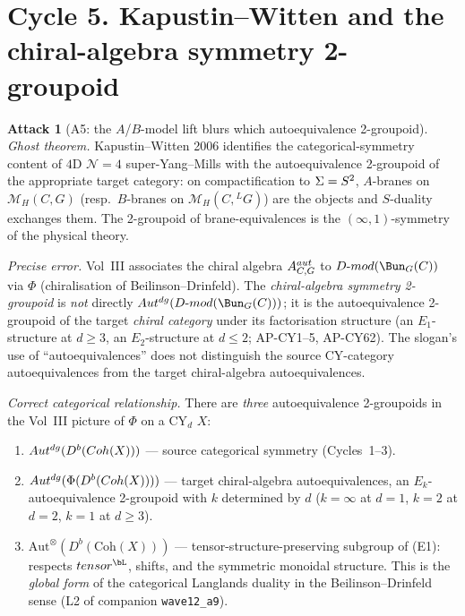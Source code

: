 \documentclass[11pt]{amsart}
\theoremstyle{definition}
\newtheorem{attack}{Attack}
\providecommand{\Coh}{\mathrm{Coh}}
\providecommand{\DMod}{D\text{-}\mathrm{mod}}
\providecommand{\Autdg}{\mathrm{Aut}^{\rm dg}}
\providecommand{\AutMon}{\mathrm{Aut}^{\otimes}}
\providecommand{\cM}{\mathcal{M}}
\providecommand{\Eone}{E_1}
\providecommand{\Etwo}{E_2}
\providecommand{\LG}{{}^L G}
\begin{document}
\section{Cycle 5. Kapustin--Witten and the chiral-algebra symmetry
2-groupoid}
\label{sec:cycle-KW}

\begin{attack}[A5: the $A$/$B$-model lift blurs which autoequivalence
2-groupoid]
\leavevmode

\noindent\emph{Ghost theorem.} Kapustin--Witten 2006 identifies the
categorical-symmetry content of $4$D $\mathcal{N} = 4$ super-Yang--Mills
with the autoequivalence 2-groupoid of the appropriate target
category: on compactification to $\Sigma = S^2$, $A$-branes on
$\cM_H(C, G)$ (resp.\ $B$-branes on $\cM_H(C, \LG)$) are the objects
and $S$-duality exchanges them. The 2-groupoid of brane-equivalences
is the $(\infty,1)$-symmetry of the physical theory.

\noindent\emph{Precise error.} Vol~III associates the chiral algebra
$\mathcal{A}^{\rm aut}_{C, G}$ to $\DMod(\Bun_G(C))$ via
$\Phi$ (chiralisation of Beilinson--Drinfeld). The
\emph{chiral-algebra symmetry 2-groupoid} is \emph{not} directly
$\Autdg(\DMod(\Bun_G(C)))$; it is the autoequivalence 2-groupoid of
the target \emph{chiral category} under its factorisation structure
(an $\Eone$-structure at $d \geq 3$, an $\Etwo$-structure at
$d \leq 2$; AP-CY1--5, AP-CY62). The slogan's use of
``autoequivalences'' does not distinguish the source CY-category
autoequivalences from the target chiral-algebra autoequivalences.

\noindent\emph{Correct categorical relationship.} There are
\emph{three} autoequivalence 2-groupoids in the Vol~III picture of
$\Phi$ on a CY$_d$ $X$:
\begin{enumerate}[label=(E\arabic*)]
 \item $\Autdg(D^b(\Coh(X)))$ --- source categorical symmetry
   (Cycles~1--3).
 \item $\Autdg(\Phi(D^b(\Coh(X))))$ --- target chiral-algebra
   autoequivalences, an $E_k$-autoequivalence 2-groupoid with
   $k$ determined by $d$ ($k = \infty$ at $d = 1$, $k = 2$ at $d = 2$,
   $k = 1$ at $d \geq 3$).
 \item $\AutMon(D^b(\Coh(X)))$ --- tensor-structure-preserving
   subgroup of (E1): respects $\otimes^{\bL}$, shifts, and the
   symmetric monoidal structure. This is the \emph{global form} of
   the categorical Langlands duality in the Beilinson--Drinfeld
   sense (L2 of companion \texttt{wave12\_a9}).
\end{enumerate}
\end{attack}
\end{document}
